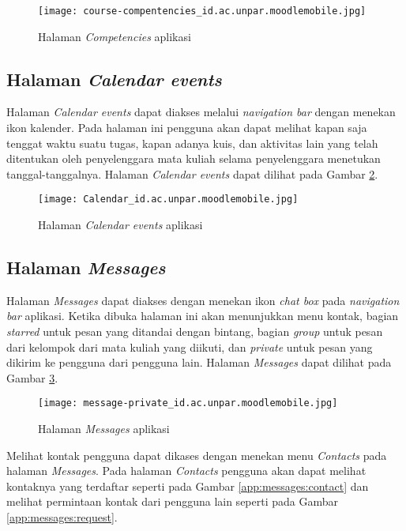 \begin{figure}[H] 
	\centering  
	\texttt{[image: course-compentencies\_id.ac.unpar.moodlemobile.jpg]}  
	\caption[Halaman \textit{Competencies} aplikasi] {Halaman \textit{Competencies} aplikasi} 
	\label{app:competencies} 
\end{figure}  

\subsection{Halaman \textit{Calendar events}}

Halaman \textit{Calendar events} dapat diakses melalui \textit{navigation bar} dengan menekan ikon kalender. Pada halaman ini pengguna akan dapat melihat kapan saja tenggat waktu suatu tugas, kapan adanya kuis, dan aktivitas lain yang telah ditentukan oleh penyelenggara mata kuliah selama penyelenggara menetukan tanggal-tanggalnya. Halaman \textit{Calendar events} dapat dilihat pada Gambar \ref{app:calendar}.

\begin{figure}[H] 
	\centering  
	\texttt{[image: Calendar\_id.ac.unpar.moodlemobile.jpg]}  
	\caption[Halaman \textit{Calendar events} aplikasi] {Halaman \textit{Calendar events} aplikasi} 
	\label{app:calendar} 
\end{figure}  

\subsection{Halaman \textit{Messages}}

Halaman \textit{Messages} dapat diakses dengan menekan ikon \textit{chat box} pada \textit{navigation bar} aplikasi. Ketika dibuka halaman ini akan menunjukkan menu kontak, bagian \textit{starred} untuk pesan yang ditandai dengan bintang, bagian \textit{group} untuk pesan dari kelompok dari mata kuliah yang diikuti, dan \textit{private} untuk pesan yang dikirim ke pengguna dari pengguna lain. Halaman \textit{Messages} dapat dilihat pada Gambar \ref{app:messages}.


\begin{figure}[H] 
	\centering  
	\texttt{[image: message-private\_id.ac.unpar.moodlemobile.jpg]}  
	\caption[Halaman \textit{Messages} aplikasi] {Halaman \textit{Messages} aplikasi} 
	\label{app:messages} 
\end{figure}  

Melihat kontak pengguna dapat dikases dengan menekan menu \textit{Contacts} pada halaman \textit{Messages}. Pada halaman \textit{Contacts} pengguna akan dapat melihat kontaknya yang terdaftar seperti pada Gambar \ref{app:messages:contact} dan melihat permintaan kontak dari pengguna lain seperti pada Gambar \ref{app:messages:request}.


